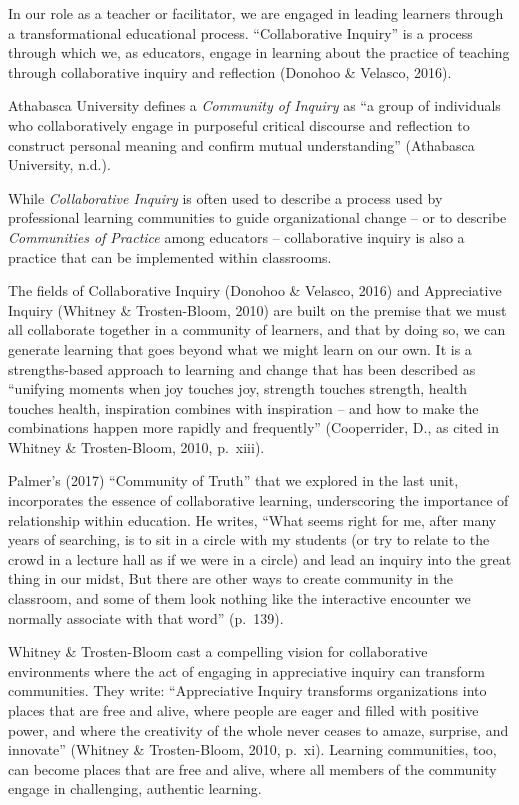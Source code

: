 \documentclass[
]{book}
\begin{document}
In our role as a teacher or facilitator, we are engaged in leading learners through a transformational educational process. ``Collaborative Inquiry'' is a process through which we, as educators, engage in learning about the practice of teaching through collaborative inquiry and reflection (Donohoo \& Velasco, 2016).

Athabasca University defines a \emph{Community of Inquiry} as ``a group of individuals who collaboratively engage in purposeful critical discourse and reflection to construct personal meaning and confirm mutual understanding'' (Athabasca University, n.d.).

While \emph{Collaborative Inquiry} is often used to describe a process used by professional learning communities to guide organizational change -- or to describe \emph{Communities of Practice} among educators -- collaborative inquiry is also a practice that can be implemented within classrooms.

The fields of Collaborative Inquiry (Donohoo \& Velasco, 2016) and Appreciative Inquiry (Whitney \& Trosten-Bloom, 2010) are built on the premise that we must all collaborate together in a community of learners, and that by doing so, we can generate learning that goes beyond what we might learn on our own. It is a strengths-based approach to learning and change that has been described as ``unifying moments when joy touches joy, strength touches strength, health touches health, inspiration combines with inspiration -- and how to make the combinations happen more rapidly and frequently'' (Cooperrider, D., as cited in Whitney \& Trosten-Bloom, 2010, p.~xiii).

Palmer's (2017) ``Community of Truth'' that we explored in the last unit, incorporates the essence of collaborative learning, underscoring the importance of relationship within education. He writes, ``What seems right for me, after many years of searching, is to sit in a circle with my students (or try to relate to the crowd in a lecture hall as if we were in a circle) and lead an inquiry into the great thing in our midst, But there are other ways to create community in the classroom, and some of them look nothing like the interactive encounter we normally associate with that word'' (p.~139).

Whitney \& Trosten-Bloom cast a compelling vision for collaborative environments where the act of engaging in appreciative inquiry can transform communities. They write: ``Appreciative Inquiry transforms organizations into places that are free and alive, where people are eager and filled with positive power, and where the creativity of the whole never ceases to amaze, surprise, and innovate'' (Whitney \& Trosten-Bloom, 2010, p.~xi). Learning communities, too, can become places that are free and alive, where all members of the community engage in challenging, authentic learning.
\end{document}

